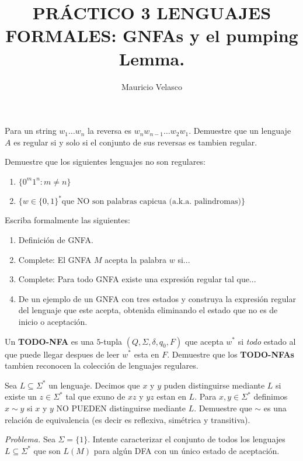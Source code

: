 \documentclass[12pt, a4paper]{article}
\date{}
\begin{document}
\title{PRÁCTICO 3 LENGUAJES FORMALES: GNFAs y el pumping Lemma.}
\author{Mauricio Velasco}
\maketitle{}


\item Para un string $w_1\dots w_n$ la reversa es $w_nw_{n-1}\dots w_2w_1$. Demuestre que un lenguaje $A$ es regular si y solo si el conjunto de sus reversas es tambien regular.

\item Demuestre que los siguientes lenguajes no son regulares:
\begin{enumerate}
\item $\{0^m1^n: m\neq n\}$
\item $\{w\in \{0,1\}^* \text{que NO son palabras capicua (a.k.a. palindromas)}\}$
\end{enumerate}

\item Escriba formalmente las siguientes:
\begin{enumerate}
\item Definición de GNFA.
\item Complete: El GNFA $M$ acepta la palabra $w$ si...
\item Complete: Para todo GNFA existe una expresión regular tal que...
\item De un ejemplo de un GNFA con tres estados y construya la expresión regular del lenguaje que este acepta, obtenida eliminando el estado que no es de inicio o aceptación.
\end{enumerate}

\item Un {\bf TODO-NFA} es una $5$-tupla $(Q,\Sigma,\delta,q_0,F)$ que acepta $w^*$ si \emph{todo} estado al que puede llegar despues de leer $w^*$ esta en $F$. Demuestre que los {\bf TODO-NFAs} tambien reconocen la colección de lenguajes regulares.

\item Sea $L\subseteq \Sigma^*$ un lenguaje. Decimos que $x$ y $y$ puden distinguirse mediante $L$ si existe un $z\in \Sigma^*$ tal que ex uno de $xz$ y $yz$ estan en $L$. Para $x,y\in \Sigma^*$ definimos $x\sim y$ si $x$ y $y$ NO PUEDEN distinguirse mediante $L$. Demuestre que $\sim$ es una relación de equivalencia (es decir es reflexiva, simétrica y transitiva).

\item {\it Problema.} Sea $\Sigma=\{1\}$. Intente caracterizar el conjunto de todos los lenguajes $L\subseteq \Sigma^*$ que son $L(M)$ para algún DFA con un \'unico estado de aceptación.
\end{document}
